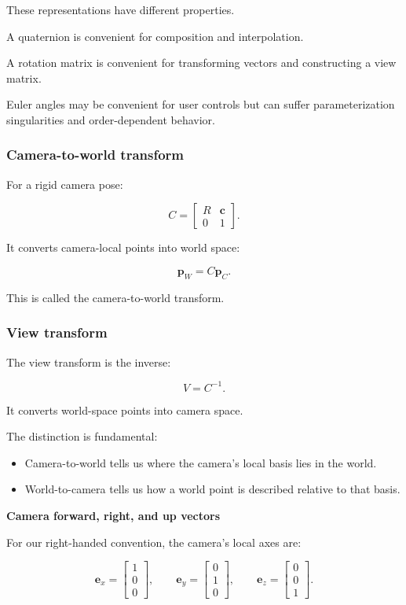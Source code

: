These representations have different properties.

A quaternion is convenient for composition and interpolation.

A rotation matrix is convenient for transforming vectors and constructing a view matrix.

Euler angles may be convenient for user controls but can suffer parameterization singularities and order-dependent behavior.

\subsubsection{Camera-to-world transform}\label{02-foundations-ii-ch032-camera-to-world-transform}

For a rigid camera pose:

\[
 \boxed{ C= \begin{bmatrix} R&\mathbf c\\ 0&1 \end{bmatrix} }.
\]

It converts camera-local points into world space:

\[
 \mathbf p_W=C\mathbf p_C.
\]

This is called the camera-to-world transform.

\subsubsection{View transform}\label{02-foundations-ii-ch032-view-transform}

The view transform is the inverse:

\[
 \boxed{V=C^{-1}}.
\]

It converts world-space points into camera space.

The distinction is fundamental:

\begin{itemize}
\tightlist
\item
  Camera-to-world tells us where the camera's local basis lies in the world.
\item
  World-to-camera tells us how a world point is described relative to that basis.
\end{itemize}

\textbf{Camera forward, right, and up vectors}

For our right-handed convention, the camera's local axes are:

\[
 \mathbf e_x= \begin{bmatrix}1\\0\\0\end{bmatrix}, \qquad \mathbf e_y= \begin{bmatrix}0\\1\\0\end{bmatrix}, \qquad \mathbf e_z= \begin{bmatrix}0\\0\\1\end{bmatrix}.
\]

